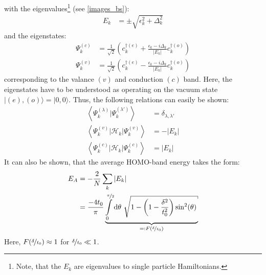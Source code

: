 with the eigenvalues\footnote{Note, that the $E_k$ are eigenvalues to single particle Hamiltonians.} (see \cref{images_bs}):
\begin{align}
	E_k &= \pm \sqrt{\epsilon_k^2+\Delta_k^2}
	\label{equation_energy_band}
\end{align}
and the eigenstates:
\begin{align}
	\Psi_k^{(c)} &= \frac{1}{\sqrt{2}}\left(c_k^{\dagger(e)}+\frac{\epsilon_k - i \Delta_k}{|E_k|}c_{k}^{\dagger(o)}\right)
	\label{equation_conduction_eigenstate}\\
	\Psi_k^{(v)} &= \frac{1}{\sqrt{2}}\left(c_k^{\dagger(e)}-\frac{\epsilon_k - i \Delta_k}{|E_k|}c_{k}^{\dagger(o)}\right)
	\label{equation_valence_eigenstate}
\end{align}
corresponding to the valance $(v)$ and conduction $(c)$ band. Here, the eigenstates have to be understood as operating on the vacuum state $|(e),(o)\rangle = |0,0\rangle$. Thus, the following relations can easily be shown:
\begin{align}
	\left\langle\Psi_k^{(\lambda)}\Big|\Psi_k^{(\lambda\prime)}\right\rangle &= \delta_{\lambda,\lambda\prime}\\
	\left\langle\Psi_k^{(v)}\Big|\mathcal{H}_{k}\Big|\Psi_k^{(v)}\right\rangle &= - |E_k|\\
	\left\langle\Psi_k^{(c)}\Big|\mathcal{H}_{k}\Big|\Psi_k^{(c)}\right\rangle &= |E_k|
\end{align}
It can also be shown, that the average HOMO-band energy takes the form:
\begin{align}
E_A &=-\frac{2}{N}\sum_k |E_k|\\
&=\frac{-4t_0}{\pi}\underbrace{\int\limits_{0}^{\nicefrac{\pi}{2}}\text{d}\theta\ \sqrt{1-\left(1-\frac{\delta^2}{t_0^2}\right)\sin^2(\theta)}}_{=:F(\nicefrac{\delta}{t_0})}
\end{align}
Here, $F\left(\nicefrac{\delta}{t_0}\right)\approx 1$ for $\nicefrac{\delta}{t_0} \ll 1$.